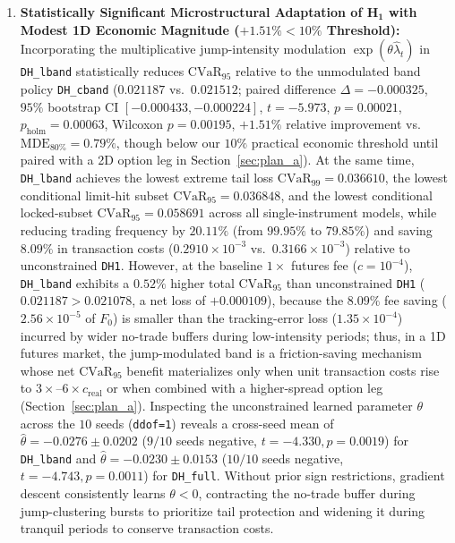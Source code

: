 \documentclass[11pt,a4paper]{article}
\begin{document}
\begin{enumerate}
  \item \textbf{Statistically Significant Microstructural Adaptation of $\mathbf{H_1}$ with Modest 1D Economic Magnitude ($+1.51\% < 10\%$ Threshold):} Incorporating the multiplicative jump-intensity modulation $\exp(\theta\hat{\lambda}_t)$ in \texttt{DH\_lband} statistically reduces $\text{CVaR}_{95}$ relative to the unmodulated band policy \texttt{DH\_cband} ($0.021187$ vs.\ $0.021512$; paired difference $\Delta = -0.000325$, $95\%$ bootstrap CI $[-0.000433, -0.000224]$, $t = -5.973$, $p = 0.00021$, $p_{\text{holm}} = 0.00063$, Wilcoxon $p = 0.00195$, $+1.51\%$ relative improvement vs.\ $\text{MDE}_{80\%} = 0.79\%$, though below our $10\%$ practical economic threshold until paired with a 2D option leg in Section~\ref{sec:plan_a}). At the same time, \texttt{DH\_lband} achieves the lowest extreme tail loss $\text{CVaR}_{99} = 0.036610$, the lowest conditional limit-hit subset $\text{CVaR}_{95} = 0.036848$, and the lowest conditional locked-subset $\text{CVaR}_{95} = 0.058691$ across all single-instrument models, while reducing trading frequency by $20.11\%$ (from $99.95\%$ to $79.85\%$) and saving $8.09\%$ in transaction costs ($0.2910 \times 10^{-3}$ vs.\ $0.3166 \times 10^{-3}$) relative to unconstrained \texttt{DH1}. However, at the baseline $1\times$ futures fee ($c = 10^{-4}$), \texttt{DH\_lband} exhibits a $0.52\%$ higher total $\text{CVaR}_{95}$ than unconstrained \texttt{DH1} ($0.021187 > 0.021078$, a net loss of $+0.000109$), because the $8.09\%$ fee saving ($2.56 \times 10^{-5}$ of $F_0$) is smaller than the tracking-error loss ($1.35 \times 10^{-4}$) incurred by wider no-trade buffers during low-intensity periods; thus, in a 1D futures market, the jump-modulated band is a friction-saving mechanism whose net $\text{CVaR}_{95}$ benefit materializes only when unit transaction costs rise to $3\times\text{--}6\times c_{\text{real}}$ or when combined with a higher-spread option leg (Section~\ref{sec:plan_a}). Inspecting the unconstrained learned parameter $\theta$ across the $10$ seeds (\texttt{ddof=1}) reveals a cross-seed mean of $\hat{\theta} = -0.0276 \pm 0.0202$ ($9/10$ seeds negative, $t = -4.330, p = 0.0019$) for \texttt{DH\_lband} and $\hat{\theta} = -0.0230 \pm 0.0153$ ($10/10$ seeds negative, $t = -4.743, p = 0.0011$) for \texttt{DH\_full}. Without prior sign restrictions, gradient descent consistently learns $\theta < 0$, contracting the no-trade buffer during jump-clustering bursts to prioritize tail protection and widening it during tranquil periods to conserve transaction costs.

\end{enumerate}
\end{document}
